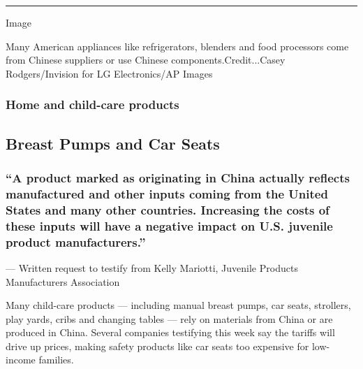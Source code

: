 \begin{center}\rule{0.5\linewidth}{\linethickness}\end{center}

Image

Many American appliances like refrigerators, blenders and food
processors come from Chinese suppliers or use Chinese
components.Credit...Casey Rodgers/Invision for LG Electronics/AP Images

\hypertarget{home-and-child-care-products}{%
\subsubsection{Home and child-care
products}\label{home-and-child-care-products}}

\hypertarget{breast-pumps-and-car-seats}{%
\subsection{Breast Pumps and Car
Seats}\label{breast-pumps-and-car-seats}}

\hypertarget{a-product-marked-as-originating-in-china-actually-reflects-manufactured-and-other-inputs-coming-from-the-united-states-and-many-other-countries-increasing-the-costs-of-these-inputs-will-have-a-negative-impact-on-us-juvenile-product-manufacturers}{%
\subsubsection{``A product marked as originating in China actually
reflects manufactured and other inputs coming from the United States and
many other countries. Increasing the costs of these inputs will have a
negative impact on U.S. juvenile product
manufacturers.''}\label{a-product-marked-as-originating-in-china-actually-reflects-manufactured-and-other-inputs-coming-from-the-united-states-and-many-other-countries-increasing-the-costs-of-these-inputs-will-have-a-negative-impact-on-us-juvenile-product-manufacturers}}

--- Written request to testify from Kelly Mariotti, Juvenile Products
Manufacturers Association

Many child-care products --- including manual breast pumps, car seats,
strollers, play yards, cribs and changing tables --- rely on materials
from China or are produced in China. Several companies testifying this
week say the tariffs will drive up prices, making safety products like
car seats too expensive for low-income families.

